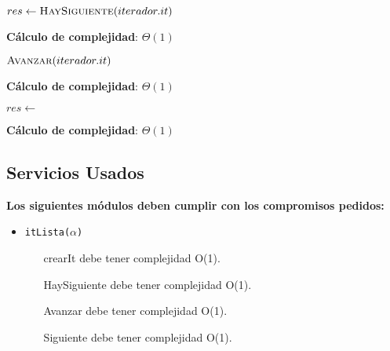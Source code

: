 \documentclass[10pt, a4paper]{article}
\let\TipoVariable=\texttt
\let\ModificadorArgumento=\textbf
\newcommand{\In}[2]{\ModificadorArgumento{in} \ensuremath{#1}\,: \TipoVariable{#2}\xspace}
\newcommand{\Inout}[2]{\ModificadorArgumento{in/out} \ensuremath{#1}\,: \TipoVariable{#2}\xspace}
\newcommand{\DRef}{\ensuremath{\rightarrow}}
\begin{document}
\begin{algorithm}[H]
\caption*{iHayMas?(\In{iterador}{iteradorUni($\alpha$)}) $\DRef res$ : \TipoVariable{Bool}}
\begin{algorithmic}[1]
	\State $res \gets \Call{HaySiguiente}{iterador.it}$
\end{algorithmic}
	\textbf{C\'alculo de complejidad}: $\Theta(1)$
\end{algorithm}

\begin{algorithm}[H]
\caption*{iSiguiente(\Inout{iterador}{iteradorUni($\alpha$)})}
\begin{algorithmic}[1]
	\State $\Call{Avanzar}{iterador.it}$
\end{algorithmic}
	\textbf{C\'alculo de complejidad}: $\Theta(1)$
\end{algorithm}

\begin{algorithm}[H]
\caption*{iActual(\In{iterador}{iteradorUni($\alpha$)}) $\DRef res$ : {$\alpha$}}
\begin{algorithmic}[1]
	\State $res \gets$ 
\end{algorithmic}
	\textbf{C\'alculo de complejidad}: $\Theta(1)$
\end{algorithm}

\subsection{Servicios Usados}

\textbf{Los siguientes m\'odulos deben cumplir con los compromisos pedidos:}

\begin{itemize}
	\item \TipoVariable{itLista($\alpha$)}
	\begin{itemize}
		\item[crearIt] debe tener complejidad O(1).
		\item[HaySiguiente] debe tener complejidad O(1).
		\item[Avanzar] debe tener complejidad O(1).
		\item[Siguiente] debe tener complejidad O(1).
	\end{itemize} 
\end{itemize}
\end{document}
